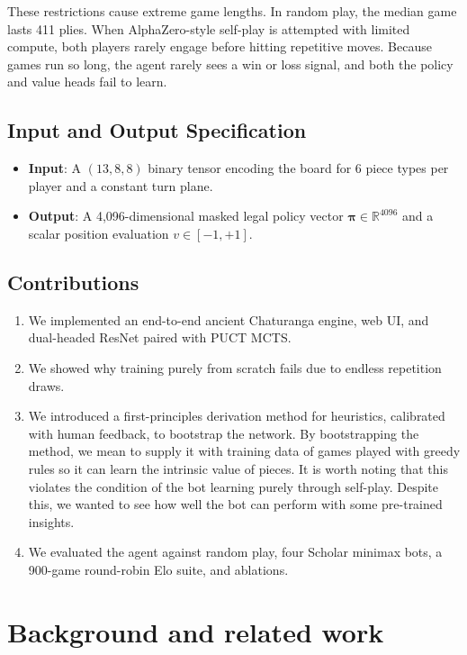 \documentclass[11pt,a4paper,twocolumn]{article}
\begin{document}
These restrictions cause extreme game lengths. In random play, the median game lasts 411 plies. When AlphaZero-style self-play is attempted with limited compute, both players rarely engage before hitting repetitive moves. Because games run so long, the agent rarely sees a win or loss signal, and both the policy and value heads fail to learn.

\subsection{Input and Output Specification}
\begin{itemize}
    \item \textbf{Input}: A $(13, 8, 8)$ binary tensor encoding the board for 6 piece types per player and a constant turn plane.
    \item \textbf{Output}: A 4,096-dimensional masked legal policy vector $\boldsymbol{\pi} \in \mathbb{R}^{4096}$ and a scalar position evaluation $v \in [-1, +1]$.
\end{itemize}

\subsection{Contributions}
\begin{enumerate}
    \item We implemented an end-to-end ancient Chaturanga engine, web UI, and dual-headed ResNet paired with PUCT MCTS.
    \item We showed why training purely from scratch fails due to endless repetition draws.
    \item We introduced a first-principles derivation method for heuristics, calibrated with human feedback, to bootstrap the network. By bootstrapping the method, we mean to supply it with training data of games played with greedy rules so it can learn the intrinsic value of pieces. It is worth noting that this violates the condition of the bot learning purely through self-play. Despite this, we wanted to see how well the bot can perform with some pre-trained insights.
    \item We evaluated the agent against random play, four Scholar minimax bots, a 900-game round-robin Elo suite, and ablations.
\end{enumerate}

\section{Background and related work}
\end{document}
